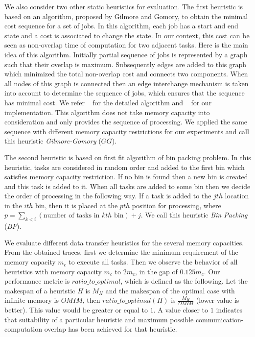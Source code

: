 \documentclass[sigconf]{acmart}
\begin{document}
{		%
		We also consider two other static heuristics for evaluation. The first heuristic is based on an algorithm, proposed by Gilmore and Gomory, to obtain the minimal cost sequence for a set of jobs. In this algorithm, each job has a start and end state and a cost is associated to change the state. In our context, this cost can be seen as non-overlap time of computation for two adjacent tasks. Here is the main idea of this algorithm. Initially partial sequence of jobs is represented by a graph such that their overlap is maximum. Subsequently edges are added to this graph which minimized the total non-overlap cost and connects two components. When all nodes of this graph is connected then an edge interchange mechanism is taken into account to determine the sequence of jobs, which ensures that the sequence has minimal cost. We refer ~\cite{Gilmore-Gomory:1964} for the detailed algorithm and ~\cite{gitworkrepo} for our implementation. This algorithm does not take memory capacity into consideration and only provides the sequence of processing. We applied the same sequence with different memory capacity restrictions for our experiments and call this heuristic \textit{Gilmore-Gomory} ($GG$).
		
		The second heuristic is based on first fit algorithm of bin packing problem. In this heuristic, tasks are considered in random order and added to the first bin which satisfies memory capacity restriction. If no bin is found then a new bin is created and this task is added to it. When all tasks are added to some bin then we decide the order of processing in the following way. If a task is added to the $jth$ location in the $ith$ bin, then it is placed at the $pth$ position for processing, where $p=\sum_{k<i}(\text{number of tasks in $kth$ bin}) + j$. We call this heuristic \textit{Bin Packing} ($BP$). 
		
		
		
		We evaluate different data transfer heuristics for the several memory capacities. From the obtained traces, first we determine the minimum requirement of the memory capacity $m_c$ to execute all tasks. Then we observe the behavior of all heuristics with memory capacity $m_c$ to $2m_c$, in the gap of $0.125m_c$. Our performance metric is $ratio\_to\_optimal$, which is defined as the following. Let the makespan of a heuristic $H$ is $M_H$ and the makespan of the optimal case with infinite memory is $OMIM$, then $ratio\_to\_optimal (H)$ is $\frac{M_H}{OMIM}$ (lower value is better). This value would be greater or equal to $1$. A value closer to $1$ indicates that suitability of a particular heuristic and maximum possible communication-computation overlap has been achieved for that heuristic.
		
}
\end{document}
